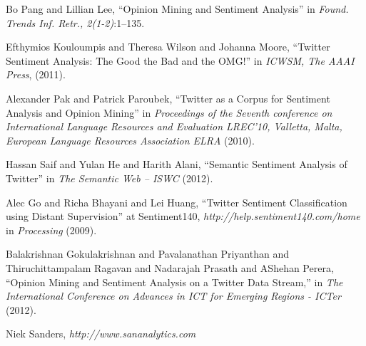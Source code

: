 \begin{thebibliography}{1}

				Bo Pang and Lillian Lee,
				``Opinion Mining and Sentiment Analysis''
				in \textit{Found. Trends Inf. Retr., 2(1-2)}:1–135.

				Efthymios Kouloumpis and Theresa Wilson and Johanna Moore,
				``Twitter Sentiment Analysis: The Good the Bad and the OMG!''
				in \textit{ICWSM, The AAAI Press}, (2011).

				Alexander Pak and Patrick Paroubek,
				``Twitter as a Corpus for Sentiment Analysis and Opinion Mining''
				in \textit{Proceedings of the Seventh conference on International Language Resources and Evaluation LREC'10,
							Valletta, Malta, European Language Resources Association ELRA} (2010).

				Hassan Saif and Yulan He and Harith Alani,
				``Semantic Sentiment Analysis of Twitter''
				in \textit{The Semantic Web – ISWC} (2012).

				Alec Go and Richa Bhayani and Lei Huang,
				``Twitter Sentiment Classification using Distant Supervision''
				at Sentiment140, \textit{http://help.sentiment140.com/home} 
				in \textit{Processing} (2009).

				Balakrishnan Gokulakrishnan and Pavalanathan Priyanthan and
				Thiruchittampalam Ragavan and Nadarajah Prasath and AShehan Perera,
				``Opinion Mining and Sentiment Analysis on a Twitter Data Stream,''
				in \textit{The International Conference on Advances in ICT for Emerging Regions - ICTer} (2012).

				Niek Sanders,
				\textit{http://www.sananalytics.com}

\end{thebibliography}
